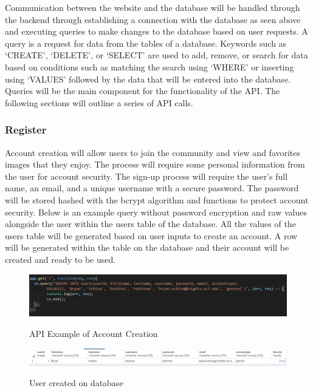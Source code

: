 \documentclass[12pt]{report}
\begin{document}
Communication between the website and the database will be handled through the backend through establishing a connection with the database as seen above and executing queries to make changes to the database based on user requests.  A query is a request for data from the tables of a database.  Keywords such as ‘CREATE’, ‘DELETE’, or ‘SELECT’ are used to add, remove, or search for data based on conditions such as matching the search using ‘WHERE’ or inserting using ‘VALUES’ followed by the data that will be entered into the database.  Queries will be the main component for the functionality of the API.  The following sections will outline a series of API calls.

\subsubsection*{Register}

Account creation will allow users to join the community and view and favorites images that they enjoy.  The process will require some personal information from the user for account security.  The sign-up process will require the user’s full name, an email, and a unique username with a secure password.  The password will be stored hashed with the bcrypt algorithm and functions to protect account security.  Below is an example query without password encryption and raw values alongside the user within the users table of the database.  All the values of the users table will be generated based on user inputs to create an account.  A row will be generated within the table on the database and their account will be created and ready to be used.

\begin{figure}[h]
	\centering
	\caption{API Example of Account Creation}
	\includegraphics[width=\linewidth]{api_raw_register}
	\label{fig:API Register}
\end{figure}

\begin{figure}[h]
	\centering
	\caption{User created on database}
	\includegraphics[width=\linewidth]{database_user}
	\label{fig:Database User}
\end{figure}
\end{document}
